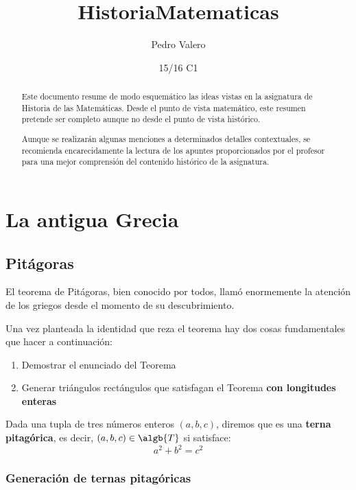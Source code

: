 \documentclass{apuntes}
\title{HistoriaMatematicas}
\author{Pedro Valero}
\date{15/16 C1}
\begin{document}
\setcounter{tocdepth}{4}

\pagestyle{plain}
\maketitle

\begin{abstract}
Este documento resume de modo esquemático las ideas vistas en la asignatura de Historia de las Matemáticas. Desde el punto de vista matemático, este resumen pretende ser completo aunque no desde el punto de vista histórico.

Aunque se realizarán algunas menciones a determinados detalles contextuales, se recomienda encarecidamente la lectura de los apuntes proporcionados por el profesor para una mejor comprensión del contenido histórico de la asignatura.
\end{abstract}

\tableofcontents
\newpage

\chapter{La antigua Grecia}

\section{Pitágoras}
El teorema de Pitágoras, bien conocido por todos, llamó enormemente la atención de los griegos desde el momento de su descubrimiento.

Una vez planteada la identidad que reza el teorema hay dos cosas fundamentales que hacer a continuación:
\begin{enumerate}
\item Demostrar el enunciado del Teorema
\item Generar triángulos rectángulos que satisfagan el Teorema \textbf{con longitudes enteras}
\end{enumerate}


\begin{defn}
Dada una tupla de tres números enteros $(a,b,c)$, diremos que es una \textbf{terna pitagórica}, es decir, $(a,b,c) \in \algb{T}$ si satisface:
\[a^2+b^2=c^2\]
\end{defn}

\subsection{Generación de ternas pitagóricas}
\end{document}
